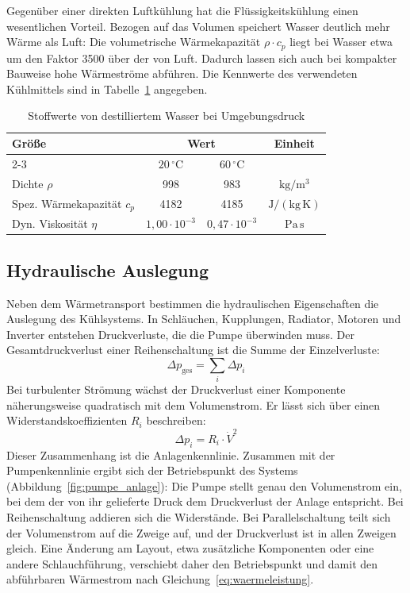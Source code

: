 Gegenüber einer direkten Luftkühlung hat die Flüssigkeitskühlung einen
wesentlichen Vorteil. Bezogen auf das Volumen speichert Wasser deutlich mehr
Wärme als Luft: Die volumetrische Wärmekapazität $\rho \cdot c_p$ liegt bei
Wasser etwa um den Faktor \num{3500} über der von Luft. Dadurch lassen sich auch
bei kompakter Bauweise hohe Wärmeströme abführen. Die Kennwerte des verwendeten
Kühlmittels sind in Tabelle~\ref{tab:stoffwerte} angegeben.

\begin{table}[htb]
  \centering
  \caption{Stoffwerte von destilliertem Wasser bei Umgebungsdruck}
  \label{tab:stoffwerte}
  \begin{tabular}{|l|c|c|c|}
    \hline
    Größe & \multicolumn{2}{c|}{Wert} & Einheit \\
    \cline{2-3}
          & $20\,^{\circ}\mathrm{C}$ & $60\,^{\circ}\mathrm{C}$ & \\
    \hline
    Dichte $\rho$              & 998  & 983  & $\mathrm{kg/m^3}$ \\
    \hline
    Spez. Wärmekapazität $c_p$ & 4182 & 4185 & $\mathrm{J/(kg\,K)}$ \\
    \hline
    Dyn. Viskosität $\eta$     & $1{,}00 \cdot 10^{-3}$ & $0{,}47 \cdot 10^{-3}$ & $\mathrm{Pa\,s}$ \\
    \hline
  \end{tabular}
\end{table}

\subsection{Hydraulische Auslegung}
\label{subsec:hydraulik}

Neben dem Wärmetransport bestimmen die hydraulischen Eigenschaften die Auslegung
des Kühlsystems. In Schläuchen, Kupplungen, Radiator, Motoren und Inverter
entstehen Druckverluste, die die Pumpe überwinden muss. Der Gesamtdruckverlust
einer Reihenschaltung ist die Summe der Einzelverluste:
\begin{equation}
  \Delta p_\mathrm{ges} = \sum_i \Delta p_i
  \label{eq:dp_ges}
\end{equation}
Bei turbulenter Strömung wächst der Druckverlust einer Komponente näherungsweise
quadratisch mit dem Volumenstrom. Er lässt sich über einen
Widerstandskoeffizienten $R_i$ beschreiben:
\begin{equation}
  \Delta p_i = R_i \cdot \dot{V}^{2}
  \label{eq:dp_komponente}
\end{equation}
Dieser Zusammenhang ist die Anlagenkennlinie. Zusammen mit der Pumpenkennlinie
ergibt sich der Betriebspunkt des Systems (Abbildung~\ref{fig:pumpe_anlage}):
Die Pumpe stellt genau den Volumenstrom ein, bei dem der von ihr gelieferte
Druck dem Druckverlust der Anlage entspricht. Bei Reihenschaltung addieren sich
die Widerstände. Bei Parallelschaltung teilt sich der Volumenstrom auf die
Zweige auf, und der Druckverlust ist in allen Zweigen gleich. Eine Änderung am
Layout, etwa zusätzliche Komponenten oder eine andere Schlauchführung,
verschiebt daher den Betriebspunkt und damit den abführbaren Wärmestrom nach
Gleichung~\eqref{eq:waermeleistung}.

